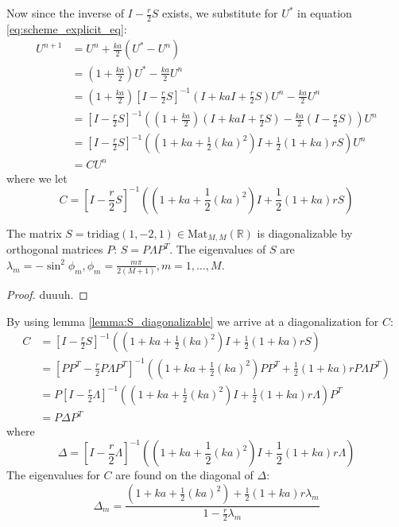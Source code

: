 Now since the inverse of \( I - \frac{r}{2}S \) exists,
we substitute for \( U^* \)
in equation \ref{eq:scheme_explicit_eq}:
\begin{align}
  U^{n+1} &= U^n + \frac{ka}{2}\left(U^*  - U^n\right) \\
          &= \left(1 + \frac{ka}{2}\right) U^* - \frac{ka}{2}U^n \\
          &= \left(1 + \frac{ka}{2}\right) {\left[I - \frac{r}{2}S\right]}^{-1} \left(I + kaI + \frac{r}{2}S\right) U^n - \frac{ka}{2}U^n \\
          &= {\left[I - \frac{r}{2}S\right]}^{-1} \left(\left(1 + \frac{ka}{2}\right)\left(I + kaI + \frac{r}{2}S\right) - \frac{ka}{2}\left(I-\frac{r}{2}S\right)\right) U^n \\
          &= {\left[I - \frac{r}{2}S\right]}^{-1} \left( \left(1+ka+\frac{1}{2}(ka)^2\right)I + \frac{1}{2}\left(1+ka\right)rS\right) U^n \\
          &= C U^n
\end{align}
where we let 
\begin{equation}
    C = {\left[I - \frac{r}{2}S\right]}^{-1} \left( \left(1+ka+\frac{1}{2}(ka)^2\right)I + \frac{1}{2}\left(1+ka\right)rS\right)
  \end{equation}

\begin{lemma}
  \label{lemma:S_diagonalizable}
  The matrix \( S = \text{tridiag}(1, -2, 1) \in \text{Mat}_{M, M}(\mathbb{R}) \)
  is diagonalizable by orthogonal matrices \( P \): \( S = P \Lambda P^T \).
  The eigenvalues of \( S \) are
  \( \lambda_m = - \sin^2 \phi_m, \phi_m = \frac{m \pi}{2(M+1)}, m = 1, \dots, M\).
\end{lemma}
\begin{proof}
    duuuh.
\end{proof}

By using lemma \ref{lemma:S_diagonalizable} we arrive at a diagonalization for \( C \):
\begin{align}
  C &= {\left[I - \frac{r}{2}S\right]}^{-1} \left( \left(1+ka+\frac{1}{2}(ka)^2\right)I + \frac{1}{2}\left(1+ka\right)rS\right) \\
    &= {\left[PP^T - \frac{r}{2}P\Lambda P^T\right]}^{-1} \left( \left(1+ka+\frac{1}{2}(ka)^2\right)PP^T + \frac{1}{2}\left(1+ka\right)r P\Lambda P^T\right) \\
    &= P{\left[I - \frac{r}{2}\Lambda \right]}^{-1} \left( \left(1+ka+\frac{1}{2}(ka)^2\right)I + \frac{1}{2}\left(1+ka\right)r \Lambda \right) P^T \\
    &= P \Delta P^T
\end{align}
where
\begin{equation}
    \Delta = {\left[I - \frac{r}{2}\Lambda \right]}^{-1} \left( \left(1+ka+\frac{1}{2}(ka)^2\right)I + \frac{1}{2}\left(1+ka\right)r \Lambda \right)
\end{equation}
The eigenvalues for \( C \) are found on the diagonal of \( \Delta \):
\begin{equation}
  \Delta_m =
      \frac{\left(1+ka+\frac{1}{2}(ka)^2\right) + \frac{1}{2}\left(1+ka\right)r \lambda_m}
      {1 - \frac{r}{2} \lambda_m}
\end{equation}

